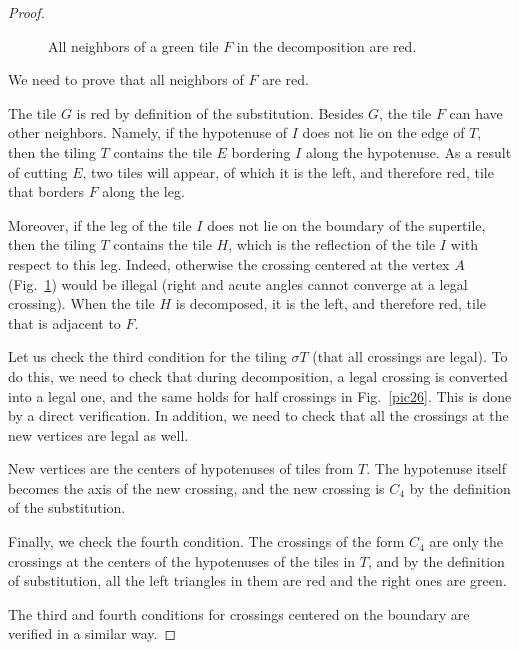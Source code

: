 \documentclass[10pt,a4paper]{amsart}
\begin{document}
\begin{proof}
\begin{figure}[ht]
\begin{center}
\end{center}
\caption{All neighbors of a green tile $F$ in the decomposition are red.}\label{pic28}
\end{figure}
We need to prove that all neighbors of $F$ are red.

The tile $G$ is red by definition of the substitution.
Besides $G$, the tile $F$ can have other neighbors.
Namely, if the hypotenuse of $I$ does not lie on the edge of $T$, then the tiling $T$ contains the tile $E$ bordering $I$ along the hypotenuse.
As a result of cutting $E$, two tiles will appear, of which it is the left, and therefore red, tile that borders $F$ along the leg.

Moreover, if the leg of the tile $I$ does not lie on the boundary of the supertile, then the tiling $T$ contains the tile $H$,
which is the reflection of the tile $I$ with respect to this leg.
Indeed, otherwise the crossing centered at the vertex $A$ (Fig.~\ref{pic28}) would be illegal
(right and acute angles cannot converge at a legal crossing).
When the tile $H$ is decomposed, it is the left, and therefore red, tile that is adjacent to $F$.

Let us check the third condition for the tiling $\sigma T$ (that all crossings are legal).
To do this, we need to check that during decomposition, a legal crossing is converted into a legal one,
and the same holds for half crossings in Fig.~\ref{pic26}.
This is done by a direct verification.
In addition, we need to check that all the crossings at the new vertices are legal as well.

New vertices are the centers of  hypotenuses of tiles from $T$.
The hypotenuse itself becomes the axis of the new crossing, and the new crossing is $C_4$ by the definition of the substitution.

 
Finally, we check the fourth condition. The crossings of the form $C_4$ are only the crossings at the centers of the hypotenuses of the tiles in $T$,
and by the definition of substitution, all the left triangles in them are red and the right ones are green.

The third and fourth conditions for crossings centered on the boundary are verified in a similar way.
\end{proof}
\end{document}
